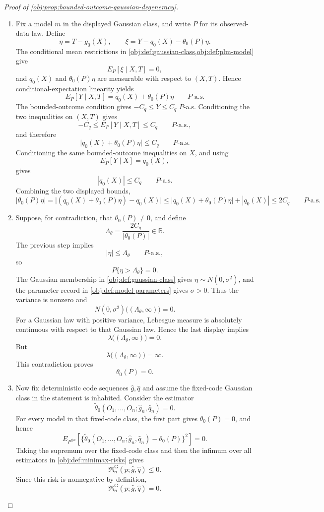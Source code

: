 \documentclass[11pt]{article}
\begin{document}
\begin{proof}[Proof of \cref{obj:prop:bounded-outcome-gaussian-degeneracy}]
\begin{enumerate}
\item Fix a model \(m\) in the displayed Gaussian class, and write \(P\) for its observed-data law. Define
\[
\eta=T-g_0(X),
\qquad
\xi=Y-q_0(X)-\theta_0(P)\eta .
\]
The conditional mean restrictions in \cref{obj:def:gaussian-class,obj:def:plm-model} give
\[
E_P[\xi\mid X,T]=0,
\]
and \(q_0(X)\) and \(\theta_0(P)\eta\) are measurable with respect to \((X,T)\). Hence conditional-expectation linearity yields
\[
E_P[Y\mid X,T]
=
q_0(X)+\theta_0(P)\eta
\qquad P\text{-a.s.}
\]
The bounded-outcome condition gives \(-C_q\le Y\le C_q\) \(P\)-a.s. Conditioning the two inequalities on \((X,T)\) gives
\[
-C_q\le E_P[Y\mid X,T]\le C_q
\qquad P\text{-a.s.},
\]
and therefore
\[
\bigl|q_0(X)+\theta_0(P)\eta\bigr|\le C_q
\qquad P\text{-a.s.}
\]
Conditioning the same bounded-outcome inequalities on \(X\), and using
\[
E_P[Y\mid X]=q_0(X),
\]
gives
\[
|q_0(X)|\le C_q
\qquad P\text{-a.s.}
\]
Combining the two displayed bounds,
\[
|\theta_0(P)\eta|
=
\bigl|(q_0(X)+\theta_0(P)\eta)-q_0(X)\bigr|
\le
\bigl|q_0(X)+\theta_0(P)\eta\bigr|+|q_0(X)|
\le 2C_q
\qquad P\text{-a.s.}
\]

\item Suppose, for contradiction, that \(\theta_0(P)\ne0\), and define
\[
\Lambda_\theta=\frac{2C_q}{|\theta_0(P)|}\in\mathbb R .
\]
The previous step implies
\[
|\eta|\le \Lambda_\theta
\qquad P\text{-a.s.},
\]
so
\[
P\{\eta>\Lambda_\theta\}=0.
\]
The Gaussian membership in \cref{obj:def:gaussian-class} gives \(\eta\sim N(0,\sigma^2)\), and the parameter record in \cref{obj:def:model-parameters} gives \(\sigma>0\). Thus the variance is nonzero and
\[
N(0,\sigma^2)\bigl((\Lambda_\theta,\infty)\bigr)=0.
\]
For a Gaussian law with positive variance, Lebesgue measure is absolutely continuous with respect to that Gaussian law. Hence the last display implies
\[
\lambda\bigl((\Lambda_\theta,\infty)\bigr)=0.
\]
But
\[
\lambda\bigl((\Lambda_\theta,\infty)\bigr)=\infty .
\]
This contradiction proves
\[
\theta_0(P)=0 .
\]

\item Now fix deterministic code sequences \(\widehat g,\widehat q\) and assume the fixed-code Gaussian class in the statement is inhabited. Consider the estimator
\[
\widetilde\theta_0(O_1,\ldots,O_n;\widehat g_n,\widehat q_n)=0 .
\]
For every model in that fixed-code class, the first part gives \(\theta_0(P)=0\), and hence
\[
E_{P^{\otimes n}}\!\left[
\{\widetilde\theta_0(O_1,\ldots,O_n;\widehat g_n,\widehat q_n)-\theta_0(P)\}^2
\right]=0 .
\]
Taking the supremum over the fixed-code class and then the infimum over all estimators in \cref{obj:def:minimax-risks} gives
\[
\mathfrak R_n^{\mathrm G}(p;\widehat g,\widehat q)\le0.
\]
Since this risk is nonnegative by definition,
\[
\mathfrak R_n^{\mathrm G}(p;\widehat g,\widehat q)=0 .
\]


\end{enumerate}
\end{proof}
\end{document}
